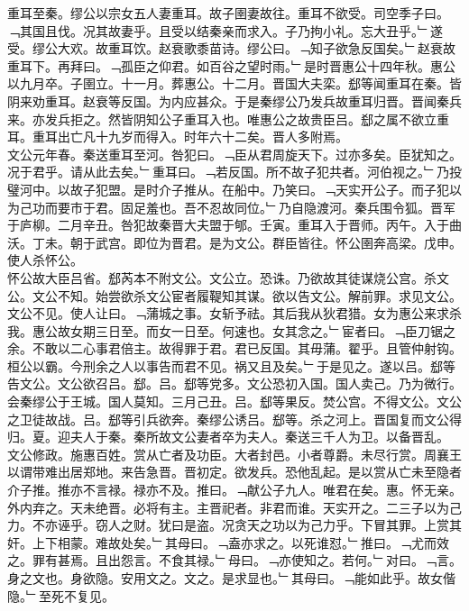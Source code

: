 \documentclass{zhvt-classic}
\begin{document}
\hspace*{2em}重耳至秦。缪公以宗女五人妻重耳。故子圉妻故往。重耳不欲受。司空季子曰。﹁其国且伐。况其故妻乎。且受以结秦亲而求入。子乃拘小礼。忘大丑乎。﹂遂受。缪公大欢。故重耳饮。赵衰歌黍苗诗。缪公曰。﹁知子欲急反国矣。﹂赵衰故重耳下。再拜曰。﹁孤臣之仰君。如百谷之望时雨。﹂是时晋惠公十四年秋。惠公以九月卒。子圉立。十一月。葬惠公。十二月。晋国大夫栾。郄等闻重耳在秦。皆阴来劝重耳。赵衰等反国。为内应甚众。于是秦缪公乃发兵故重耳归晋。晋闻秦兵来。亦发兵拒之。然皆阴知公子重耳入也。唯惠公之故贵臣吕。郄之属不欲立重耳。重耳出亡凡十九岁而得入。时年六十二矣。晋人多附焉。\\
\hspace*{2em}文公元年春。秦送重耳至河。咎犯曰。﹁臣从君周旋天下。过亦多矣。臣犹知之。况于君乎。请从此去矣。﹂重耳曰。﹁若反国。所不故子犯共者。河伯视之。﹂乃投璧河中。以故子犯盟。是时介子推从。在船中。乃笑曰。﹁天实开公子。而子犯以为己功而要市于君。固足羞也。吾不忍故同位。﹂乃自隐渡河。秦兵围令狐。晋军于庐柳。二月辛丑。咎犯故秦晋大夫盟于郇。壬寅。重耳入于晋师。丙午。入于曲沃。丁未。朝于武宫。即位为晋君。是为文公。群臣皆往。怀公圉奔高梁。戊申。使人杀怀公。\\
\hspace*{2em}怀公故大臣吕省。郄芮本不附文公。文公立。恐诛。乃欲故其徒谋烧公宫。杀文公。文公不知。始尝欲杀文公宦者履鞮知其谋。欲以告文公。解前罪。求见文公。文公不见。使人让曰。﹁蒲城之事。女斩予祛。其后我从狄君猎。女为惠公来求杀我。惠公故女期三日至。而女一日至。何速也。女其念之。﹂宦者曰。﹁臣刀锯之余。不敢以二心事君倍主。故得罪于君。君已反国。其毋蒲。翟乎。且管仲射钩。桓公以霸。今刑余之人以事告而君不见。祸又且及矣。﹂于是见之。遂以吕。郄等告文公。文公欲召吕。郄。吕。郄等党多。文公恐初入国。国人卖己。乃为微行。会秦缪公于王城。国人莫知。三月己丑。吕。郄等果反。焚公宫。不得文公。文公之卫徒故战。吕。郄等引兵欲奔。秦缪公诱吕。郄等。杀之河上。晋国复而文公得归。夏。迎夫人于秦。秦所故文公妻者卒为夫人。秦送三千人为卫。以备晋乱。\\
\hspace*{2em}文公修政。施惠百姓。赏从亡者及功臣。大者封邑。小者尊爵。未尽行赏。周襄王以谓带难出居郑地。来告急晋。晋初定。欲发兵。恐他乱起。是以赏从亡未至隐者介子推。推亦不言禄。禄亦不及。推曰。﹁献公子九人。唯君在矣。惠。怀无亲。外内弃之。天未绝晋。必将有主。主晋祀者。非君而谁。天实开之。二三子以为己力。不亦诬乎。窃人之财。犹曰是盗。况贪天之功以为己力乎。下冒其罪。上赏其奸。上下相蒙。难故处矣。﹂其母曰。﹁盍亦求之。以死谁怼。﹂推曰。﹁尤而效之。罪有甚焉。且出怨言。不食其禄。﹂母曰。﹁亦使知之。若何。﹂对曰。﹁言。身之文也。身欲隐。安用文之。文之。是求显也。﹂其母曰。﹁能如此乎。故女偕隐。﹂至死不复见。\\
\end{document}
